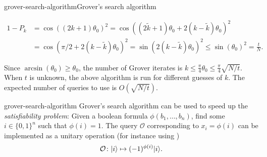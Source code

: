 \begin{topic}{grover-search-algorithm}{Grover's search algorithm}
\begin{enumerate}[label=(\arabic*)]
\[\begin{aligned}
            1 - P_k
                &= \cos((2k + 1) \theta_0)^2 = \cos((2 \tilde{k} + 1) \theta_0 + 2 (k - \tilde{k}) \theta_0)^2 \\
                &= \cos(\pi/2 + 2 (k - \tilde{k}) \theta_0)^2 = \sin(2(k - \tilde{k}) \theta_0)^2 \le \sin(\theta_0)^2 = \frac{t}{N} .
        \end{aligned} \]
    \end{enumerate}
    Since $\arcsin(\theta_0) \ge \theta_0$, the number of Grover iterates is $k \le \tfrac{\pi}{4} \theta_0 \le \tfrac{\pi}{4} \sqrt{N/t}$. When $t$ is unknown, the above algorithm is run for different guesses of $k$. The expected number of queries to use is $O(\sqrt{N / t})$.
\end{topic}

\begin{example}{grover-search-algorithm}
    Grover's search algorithm can be used to speed up the \textit{satisfiability problem}: Given a boolean formula $\phi(b_1, \ldots, b_n)$, find some $i \in \{ 0, 1\}^n$ such that $\phi(i) = 1$. The query $\mathcal{O}$ corresponding to $x_i = \phi(i)$ can be implemented as a unitary operation (for instance using )
    \[ \mathcal{O} \colon |i\rangle \mapsto (-1)^{\phi(i)} |i\rangle . \]
\end{example}

